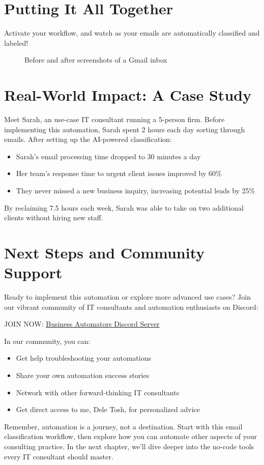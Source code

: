 \section{Putting It All Together}

Activate your workflow, and watch as your emails are automatically classified and labeled!

\begin{figure}[H]
    \centering
    \caption{Before and after screenshots of a Gmail inbox}
\end{figure}


\section{Real-World Impact: A Case Study}

Meet Sarah, an use-case IT consultant running a 5-person firm. Before implementing this automation, Sarah spent 2 hours each day sorting through emails. After setting up the AI-powered classification:

\begin{itemize}
    \item Sarah's email processing time dropped to 30 minutes a day
    \item Her team's response time to urgent client issues improved by 60\%
    \item They never missed a new business inquiry, increasing potential leads by 25\%
\end{itemize}

By reclaiming 7.5 hours each week, Sarah was able to take on two additional clients without hiring new staff.


\section{Next Steps and Community Support}

Ready to implement this automation or explore more advanced use cases? Join our vibrant community of IT consultants and automation enthusiasts on Discord:

JOIN NOW: \href{https://discord.gg/P6txNctp}{Business Automators Discord Server}

In our community, you can:
\begin{itemize}
    \item Get help troubleshooting your automations
    \item Share your own automation success stories
    \item Network with other forward-thinking IT consultants
    \item Get direct access to me, Dele Tosh, for personalized advice
\end{itemize}

Remember, automation is a journey, not a destination. Start with this email classification workflow, then explore how you can automate other aspects of your consulting practice. In the next chapter, we'll dive deeper into the no-code tools every IT consultant should master.